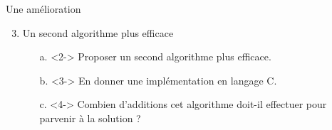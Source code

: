 \documentclass[10pt]{beamer}
\begin{document}
\begin{frame}{\Ctitle}
	\begin{block}{Une amélioration}
		\begin{enumerate} \setcounter{enumi}{2}
			\item<1-> Un second algorithme plus efficace
			\begin{enumerate}
				\item[a.]<2-> Proposer un second algorithme plus efficace.
				\item[b.]<3-> En donner une implémentation en langage C.
				\item[c.]<4-> Combien d'additions cet algorithme doit-il effectuer pour parvenir à la solution ? \\
			\end{enumerate}
		\end{enumerate}
	\end{block}
\end{frame}
\end{document}

